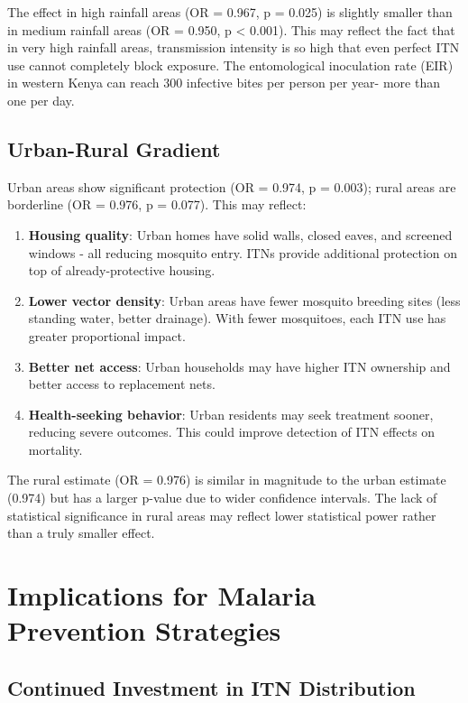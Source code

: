 The effect in high rainfall areas (OR = 0.967, p = 0.025) is slightly smaller than in medium rainfall areas (OR = 0.950, p < 0.001). This may reflect the fact that in very high rainfall areas, transmission intensity is so high that even perfect ITN use cannot completely block exposure. The entomological inoculation rate (EIR) in western Kenya can reach 300 infective bites per person per year- more than one per day.

\subsection{Urban-Rural Gradient}

Urban areas show significant protection (OR = 0.974, p = 0.003); rural areas are borderline (OR = 0.976, p = 0.077). This may reflect:

\begin{enumerate}
	\item \textbf{Housing quality}: Urban homes have solid walls, closed eaves, and screened windows - all reducing mosquito entry. ITNs provide additional protection on top of already-protective housing.
	
	\item \textbf{Lower vector density}: Urban areas have fewer mosquito breeding sites (less standing water, better drainage). With fewer mosquitoes, each ITN use has greater proportional impact.
	
	\item \textbf{Better net access}: Urban households may have higher ITN ownership and better access to replacement nets.
	
	\item \textbf{Health-seeking behavior}: Urban residents may seek treatment sooner, reducing severe outcomes. This could improve detection of ITN effects on mortality.
\end{enumerate}

The rural estimate (OR = 0.976) is similar in magnitude to the urban estimate (0.974) but has a larger p-value due to wider confidence intervals. The lack of statistical significance in rural areas may reflect lower statistical power rather than a truly smaller effect.

\section{Implications for Malaria Prevention Strategies}

\subsection{Continued Investment in ITN Distribution}

